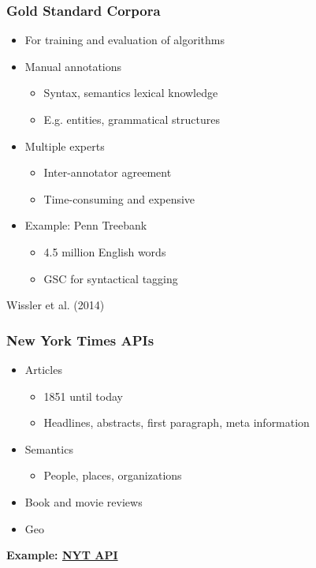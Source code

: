 \begin{frame}
    \frametitle{Gold Standard Corpora}
    \begin{itemize}
        \item For training and evaluation of algorithms
    \end{itemize}
    \begin{itemize}
        \item Manual annotations
    \begin{itemize}
        \item Syntax, semantics lexical knowledge
        \item E.g. entities, grammatical structures
    \end{itemize}
    \end{itemize}
    \begin{itemize}
    \item Multiple experts
    \begin{itemize}
        \item Inter-annotator agreement
        \item Time-consuming and expensive
    \end{itemize}
    \end{itemize}
    \begin{itemize}
    \item Example: Penn Treebank
    \begin{itemize}
        \item 4.5 million English words
        \item GSC for syntactical tagging
    \end{itemize}
    \end{itemize}
\begin{flushright}
    \textcolor{iseblue}{Wissler et al. (2014)}
\end{flushright}
\end{frame}

\begin{frame}
    \frametitle{New York Times APIs}
    \begin{itemize}
        \item Articles
    \begin{itemize}
        \item 1851 until today
        \item Headlines, abstracts, first paragraph, meta information
    \end{itemize}
    \item Semantics
    \begin{itemize}
        \item People, places, organizations
    \end{itemize}
    \item Book and movie reviews
    \item Geo
    \end{itemize}
    \vspace{10pt}
    {
    \begin{center}
    \LARGE \bf
    \color{isegreen} Example: \href{http://localhost:8888/notebooks/live_examples/nyt_api.ipynb}{NYT API}
    \end{center}
    }
\end{frame}



